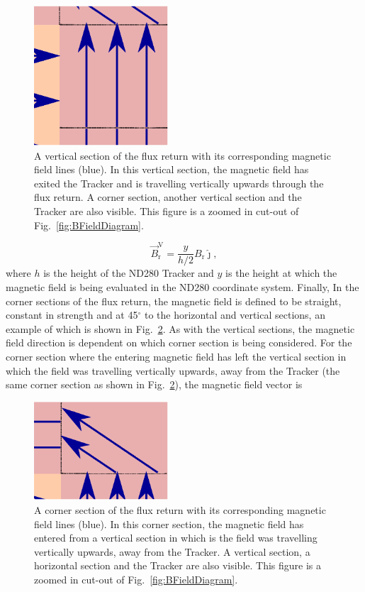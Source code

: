 \begin{figure}
  \centering
  \includegraphics[width=5cm]{images/magnetic_field/BFieldDiagramVerticalSection}
  \caption{A vertical section of the flux return with its corresponding magnetic field lines (blue).  In this vertical section, the magnetic field has exited the Tracker and is travelling vertically upwards through the flux return. A corner section, another vertical section and the Tracker are also visible.  This figure is a zoomed in cut-out of Fig.~\ref{fig:BFieldDiagram}.}
  \label{fig:BFieldDiagramVerticalSection}
\end{figure}
\begin{equation}
  \overrightarrow{B}^{\textrm{V}}_{\textrm{r}} = \frac{y}{h/2}{B_{\textrm{r}}}\hat{\jmath},
  \label{eqn:VerticalReturnBFieldVector}
\end{equation}
where $h$ is the height of the ND280 Tracker and $y$ is the height at which the magnetic field is being evaluated in the ND280 coordinate system.  
\newline
\newline
Finally, In the corner sections of the flux return, the magnetic field is defined to be straight, constant in strength and at 45$^\circ$ to the horizontal and vertical sections, an example of which is shown in Fig.~\ref{fig:BFieldDiagramCornerSection}.  As with the vertical sections, the magnetic field direction is dependent on which corner section is being considered.  For the corner section where the entering magnetic field has left the vertical section in which the field was travelling vertically upwards, away from the Tracker (the same corner section as shown in Fig.~\ref{fig:BFieldDiagramCornerSection}), the magnetic field vector is
\begin{figure}
  \centering
  \includegraphics[width=5cm]{images/magnetic_field/BFieldDiagramCornerSection}
  \caption{A corner section of the flux return with its corresponding magnetic field lines (blue).  In this corner section, the magnetic field has entered from a vertical section in which is the field was travelling vertically upwards, away from the Tracker. A vertical section, a horizontal section and the Tracker are also visible.  This figure is a zoomed in cut-out of Fig.~\ref{fig:BFieldDiagram}.}
  \label{fig:BFieldDiagramCornerSection}
\end{figure}
